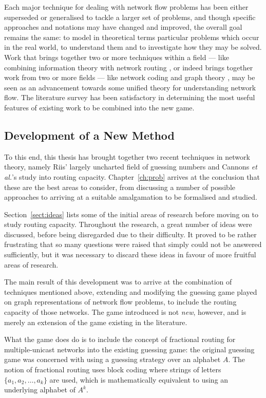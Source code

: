 Each major technique for dealing with network flow problems has been either superseded or generalised to tackle a larger set of problems, and though specific approaches and notations may have changed and improved, the overall goal remains the same: to model in theoretical terms particular problems which occur in the real world, to understand them and to investigate how they may be solved. Work that brings together two or more techniques within a field --- like combining information theory with network routing \cite{ahls2000}, or indeed brings together work from two or more fields --- like network coding and graph theory \cite{riis2005util, riis2005info}, may be seen as an advancement towards some unified theory for understanding network flow. The literature survey has been satisfactory in determining the most useful features of existing work to be combined into the new game.

\subsection{Development of a New Method}

To this end, this thesis has brought together two recent techniques in network theory, namely Riis' largely uncharted field of guessing numbers and Cannons \textit{et al.}'s study into routing capacity. Chapter~\ref{ch:prob} arrives at the conclusion that these are the best areas to consider, from discussing a number of possible approaches to arriving at a suitable amalgamation to be formalised and studied.

Section~\ref{sect:ideas} lists some of the initial areas of research before moving on to study routing capacity. Throughout the research, a great number of ideas were discussed, before being disregarded due to their difficulty. It proved to be rather frustrating that so many questions were raised that simply could not be answered sufficiently, but it was necessary to discard these ideas in favour of more fruitful areas of research.

The main result of this development was to arrive at the combination of techniques mentioned above, extending and modifying the guessing game played on graph representations of network flow problems, to include the routing capacity of those networks. The game introduced is not \emph{new}, however, and is merely an extension of the game existing in the literature.

What the game does do is to include the concept of fractional routing for multiple-unicast networks into the existing guessing game: the original guessing game was concerned with using a guessing strategy over an alphabet $A$. The notion of fractional routing uses block coding where strings of letters $\{ a_1, a_2, \dots, a_k \}$ are used, which is mathematically equivalent to using an underlying alphabet of $A^k$.

